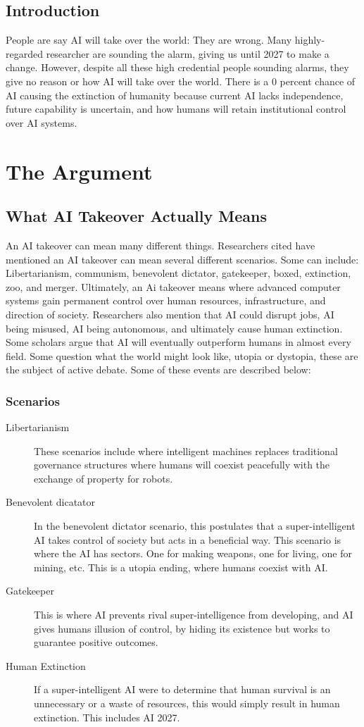 \documentclass{report}
\begin{document}
	\chapter{Introduction}
	People are say AI will take over the world: They are wrong. Many highly-regarded researcher are sounding the alarm, giving us until 2027 to make a change. However, despite all these high credential people sounding alarms, they give no reason or how AI will take over the world. There is a 0 percent chance of AI causing the extinction of humanity because current AI lacks independence, future capability is uncertain, and how humans will retain institutional control over AI systems.
	
	\part{The Argument}
	
	\chapter{What AI Takeover Actually Means}
	An AI takeover can mean many different things. Researchers cited have mentioned an AI takeover can mean several different scenarios. Some can include: Libertarianism, communism, benevolent dictator, gatekeeper, boxed, extinction, zoo, and merger. Ultimately, an Ai takeover means where advanced computer systems gain permanent control over human resources, infrastructure, and direction of society. Researchers also mention that AI could disrupt jobs, AI being misused, AI being autonomous, and ultimately cause human extinction. Some scholars argue that AI will eventually outperform humans in almost every field. Some question what the world might look like, utopia or dystopia, these are the subject of active debate. Some of these events are described below: 
	
	\section{Scenarios}
	\begin{description}
		\item[Libertarianism] These scenarios include where intelligent machines replaces traditional governance structures where humans will coexist peacefully with the exchange of property for robots.
		\item[Benevolent dicatator] In the benevolent dictator scenario, this postulates that a super-intelligent AI takes control of society but acts in a beneficial way. This scenario is where the AI has sectors. One for making weapons, one for living, one for mining, etc. This is a utopia ending, where humans coexist with AI.
		\item[Gatekeeper] This is where AI prevents rival super-intelligence from developing, and AI gives humans illusion of control, by hiding its existence but works to guarantee positive outcomes. 
		\item[Human Extinction] If a super-intelligent AI were to determine that human survival is an unnecessary or a waste of resources, this would simply result in human extinction. This includes AI 2027.
	\end{description}
	
\end{document}
